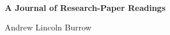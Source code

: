 %
%

\begin{titlepage}
  \normalfont\sffamily\huge%
  \mbox{}

  \vfill{}

  \begin{center}
    \bfseries%
    A Journal of Research-Paper Readings%
  \end{center}

  \vfill{}

  \begin{center}
    Andrew Lincoln Burrow
  \end{center}

  \vfill{}

  \mbox{}
\end{titlepage}

